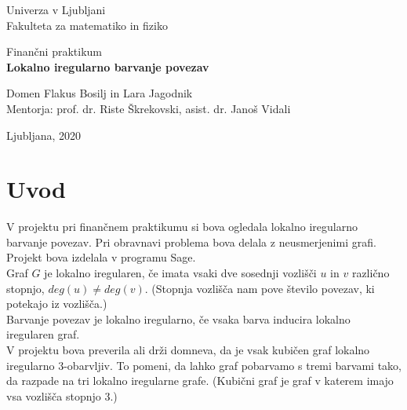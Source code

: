\documentclass[12pt, a4paper]{article}
\begin{document}
\begin{titlepage}
\begin{center}

\large
Univerza v Ljubljani\\
\normalsize
Fakulteta za matematiko in fiziko\\

\vspace{5 cm} 

\large
Finančni praktikum \\


\vspace{0.5cm}
\LARGE
\textbf{Lokalno iregularno barvanje povezav}

\vspace{0.5 cm}

\large
Domen Flakus Bosilj in Lara Jagodnik \\


\vspace{1.5cm}
\normalsize
Mentorja: prof. dr. Riste Škrekovski, asist. dr. Janoš Vidali
\vspace{3cm}


\vfill

\large Ljubljana, 2020

\end{center}
\end{titlepage}


\newpage

\tableofcontents
\vspace{22mm}

\newpage

\section{Uvod}

V projektu pri finančnem praktikumu si bova ogledala lokalno iregularno barvanje povezav. Pri obravnavi problema bova delala z neusmerjenimi grafi. Projekt bova izdelala v programu Sage. \\
Graf $G$ je lokalno iregularen, če imata vsaki dve sosednji vozlišči $u$ in $v$ različno stopnjo, $deg(u) \neq deg(v)$. (Stopnja vozlišča nam pove število povezav, ki potekajo iz vozlišča.) \\
Barvanje povezav je lokalno iregularno, če vsaka barva inducira lokalno iregularen graf. \\
V projektu bova preverila ali drži domneva, da je vsak kubičen graf lokalno iregularno 3-obarvljiv. To pomeni, da lahko graf pobarvamo s tremi barvami tako, da razpade na tri lokalno iregularne grafe. (Kubični graf je graf v katerem imajo vsa vozlišča stopnjo 3.)\\
\end{document}
